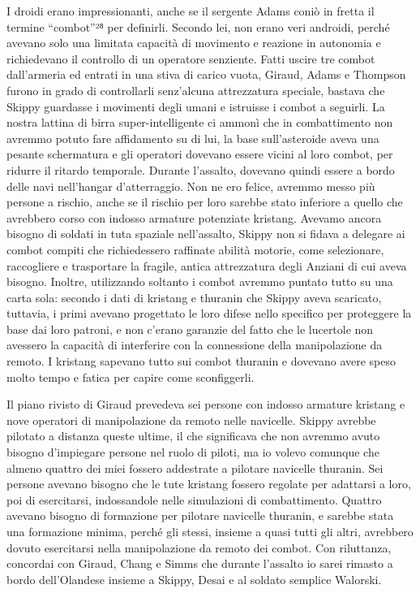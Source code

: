I droidi erano impressionanti, anche se il sergente Adams coniò in
fretta il termine ``combot''²⁸ per definirli. Secondo lei, non erano
veri androidi, perché avevano solo una limitata capacità di movimento e
reazione in autonomia e richiedevano il controllo di un operatore
senziente. Fatti uscire tre combot dall'armeria ed entrati in una stiva
di carico vuota, Giraud, Adams e Thompson furono in grado di
controllarli senz'alcuna attrezzatura speciale, bastava che Skippy
guardasse i movimenti degli umani e istruisse i combot a seguirli. La
nostra lattina di birra super-intelligente ci ammonì che in
combattimento non avremmo potuto fare affidamento su di lui, la base
sull'asteroide aveva una pesante schermatura e gli operatori dovevano
essere vicini al loro combot, per ridurre il ritardo temporale. Durante
l'assalto, dovevano quindi essere a bordo delle navi nell'hangar
d'atterraggio. Non ne ero felice, avremmo messo più persone a rischio,
anche se il rischio per loro sarebbe stato inferiore a quello che
avrebbero corso con indosso armature potenziate kristang. Avevamo ancora
bisogno di soldati in tuta spaziale nell'assalto, Skippy non si fidava a
delegare ai combot compiti che richiedessero raffinate abilità motorie,
come selezionare, raccogliere e trasportare la fragile, antica
attrezzatura degli Anziani di cui aveva bisogno. Inoltre, utilizzando
soltanto i combot avremmo puntato tutto su una carta sola: secondo i
dati di kristang e thuranin che Skippy aveva scaricato, tuttavia, i
primi avevano progettato le loro difese nello specifico per proteggere
la base dai loro patroni, e non c'erano garanzie del fatto che le
lucertole non avessero la capacità di interferire con la connessione
della manipolazione da remoto. I kristang sapevano tutto sui combot
thuranin e dovevano avere speso molto tempo e fatica per capire come
sconfiggerli.

Il piano rivisto di Giraud prevedeva sei persone con indosso armature
kristang e nove operatori di manipolazione da remoto nelle navicelle.
Skippy avrebbe pilotato a distanza queste ultime, il che significava che
non avremmo avuto bisogno d'impiegare persone nel ruolo di piloti, ma io
volevo comunque che almeno quattro dei miei fossero addestrate a
pilotare navicelle thuranin. Sei persone avevano bisogno che le tute
kristang fossero regolate per adattarsi a loro, poi di esercitarsi,
indossandole nelle simulazioni di combattimento. Quattro avevano bisogno
di formazione per pilotare navicelle thuranin, e sarebbe stata una
formazione minima, perché gli stessi, insieme a quasi tutti gli altri,
avrebbero dovuto esercitarsi nella manipolazione da remoto dei combot.
Con riluttanza, concordai con Giraud, Chang e Simms che durante
l'assalto io sarei rimasto a bordo dell'Olandese insieme a Skippy, Desai
e al soldato semplice Walorski.

